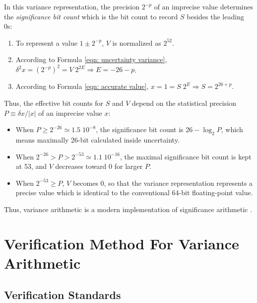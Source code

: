 \documentclass[twoside]{article}
\numberwithin{equation}{section}
\begin{document}
In this variance representation, the precision $2^{-p}$ of an imprecise value determines the \emph{significance bit count} which is the bit count to record $S$ besides the leading 0s:
\begin{enumerate}
\item To represent a value $1 \pm 2^{-p}$, $V$ is normalized as $2^{52}$.

\item According to Formula \eqref{eqn: uncertainty variance}, $\delta^2 x = (2^{-p})^2 = V \; 2^{2E} \Rightarrow E = -26 - p$.

\item According to Formula \eqref{eqn: accurate value}, $ x = 1 = S \; 2^E \Rightarrow S = 2^{26 + p}$.  
\end{enumerate}
Thus, the effective bit counts for $S$ and $V$ depend on the statistical precision $P \equiv \delta x / |x|$ of an imprecise value $x$:
\begin{itemize}
\item When $P \geq 2^{-26} \simeq 1.5\;10^{-8}$, the significance bit count is $26 - \log_{2} P$, which means maximally 26-bit calculated inside uncertainty.

\item When $2^{-26} > P > 2^{-53} \simeq 1.1\;10^{-16}$, the maximal significance bit count is kept at 53, and $V$ decreases toward 0 for larger $P$.

\item When $2^{-53} \geq P$, $V$ becomes 0, so that the variance representation represents a precise value which is identical to the conventional 64-bit floating-point value.
\end{itemize}
Thus, variance arithmetic is a modern implementation of significance arithmetic \cite{Significance_Arithmetic} \cite{Digital_Significance_Arithmetic} \cite{Unnormalized_Arithmetic}.


\clearpage
\section{Verification Method For Variance Arithmetic}
\label{sec: validation}


\subsection{Verification Standards \cite{Prev_Precision_Arithmetic}}
\end{document}
